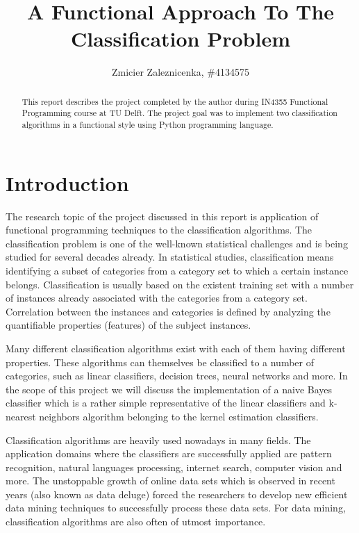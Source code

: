 \documentclass{llncs}
\begin{document}
\title{A Functional Approach To The Classification Problem}
\author{Zmicier Zaleznicenka, \#4134575}

\maketitle

\begin{abstract}
This report describes the project completed by the author during IN4355 Functional Programming course at TU Delft. The project goal was to implement two classification algorithms in a functional style using Python programming language.
\end{abstract}

\section{Introduction}

The research topic of the project discussed in this report is application of functional programming techniques to the classification algorithms. The classification problem is one of the well-known statistical challenges and is being studied for several decades already. In statistical studies, classification means identifying a subset of categories from a category set to which a certain instance belongs. Classification is usually based on the existent training set with a number of instances already associated with the categories from a category set. Correlation between the instances and categories is defined by analyzing the quantifiable properties (features) of the subject instances\cite{WikiStatClass}.

Many different classification algorithms exist with each of them having different properties. These algorithms can themselves be classified to a number of categories, such as linear classifiers, decision trees, neural networks and more. In the scope of this project we will discuss the implementation of a naive Bayes classifier which is a rather simple representative of the linear classifiers and k-nearest neighbors algorithm belonging to the kernel estimation classifiers.

Classification algorithms are heavily used nowadays in many fields. The application domains where the classifiers are successfully applied are pattern recognition, natural languages processing, internet search, computer vision and more. The unstoppable growth of online data sets which is observed in recent years (also known as data deluge) forced the researchers to develop new efficient data mining techniques to successfully process these data sets. For data mining, classification algorithms are also often of utmost importance.
\end{document}
